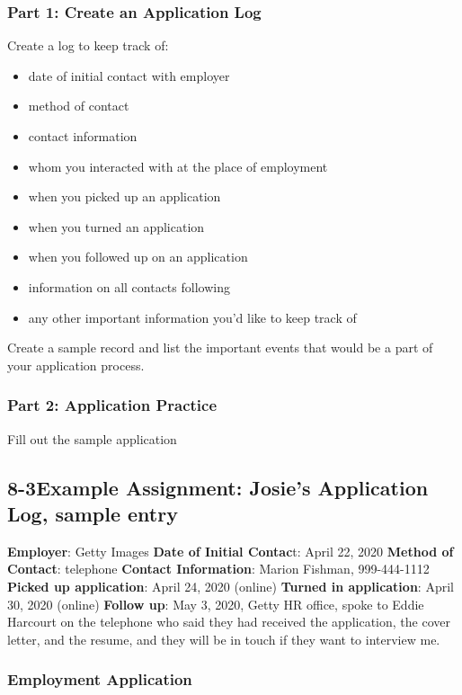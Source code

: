 \subsubsection*{Part 1: Create an Application Log}
Create a log to keep track of:
\begin{itemize}
\item date of initial contact with employer
\item method of contact
\item contact information
\item whom you interacted with at the place of employment
\item when you picked up an application
\item when you turned an application
\item when you followed up on an application
\item information on all contacts following
\item any other important information you'd like to keep track of
\end{itemize}
Create a sample record and list the important events that would be a part of your application process. 

\subsubsection*{Part 2: Application Practice}
Fill out the sample application

\pagebreak \subsection*{8-3\quad Example Assignment: Josie's Application Log, sample entry}
\textbf{Employer}: Getty Images
\break \textbf{Date of Initial Contac}t: April 22, 2020 
\break \textbf{Method of Contact}: telephone
\break \textbf{Contact Information}: Marion Fishman, 999-444-1112
\break \textbf{Picked up application}: April 24, 2020 (online) 
\break \textbf{Turned in application}: April 30, 2020 (online)
\break \textbf{Follow up}: May 3, 2020, Getty HR office, spoke to Eddie Harcourt on the telephone who said they had received the application, the cover letter, and the resume, and they will be in touch if they want to interview me.
 
\subsubsection*{Employment Application}

